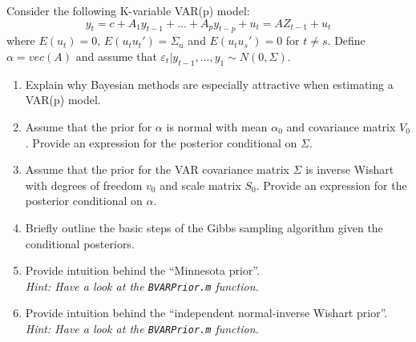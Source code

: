 Consider the following K-variable VAR(p) model:
$$y_t = c + A_1 y_{t-1} + ... + A_p y_{t-p} + u_t= AZ_{t-1} + u_t$$ where $E(u_t)=0$, $E(u_t u_t')=\Sigma_{u}$ and $E(u_t u_s')=0$ for $t\neq s$. Define $\alpha = vec(A)$ and assume that $\varepsilon_t|y_{t-1},...,y_1\sim N(0,\Sigma)$.
\begin{enumerate}
    \item Explain why Bayesian methods are especially attractive when estimating a VAR(p) model.
    \item Assume that the prior for $\alpha$ is normal with mean $\alpha_0$ and covariance matrix $V_0$. Provide an expression for the posterior conditional on $\Sigma$.
    \item Assume that the prior for the VAR covariance matrix $\Sigma$ is inverse Wishart with degrees of freedom $v_0$ and scale matrix $S_0$. Provide an expression for the posterior conditional on $\alpha$.
    \item Briefly outline the basic steps of the Gibbs sampling algorithm given the conditional posteriors.
    \item Provide intuition behind the \enquote{Minnesota prior}.\\\emph{Hint: Have a look at the \texttt{BVARPrior.m} function.}
    \item Provide intuition behind the \enquote{independent normal-inverse Wishart prior}.\\\emph{Hint: Have a look at the \texttt{BVARPrior.m} function.}
\end{enumerate}
